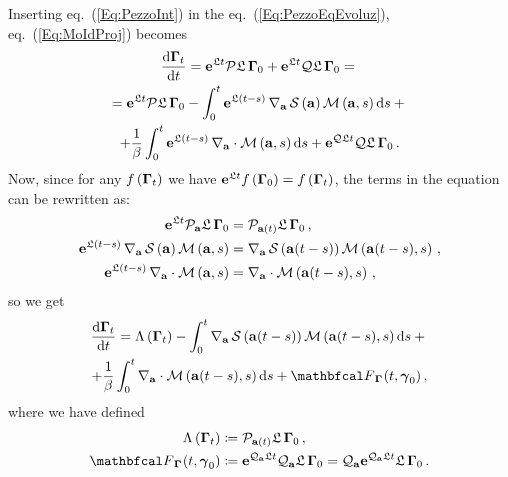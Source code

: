 \documentclass[10pt,a4paper]{book}
\theoremstyle{definition}
\begin{document}
\noindent
Inserting eq.~(\ref{Eq:PezzoInt}) in the eq.~(\ref{Eq:PezzoEqEvoluz}), eq.~(\ref{Eq:MoIdProj}) becomes
\begin{multline}
 \frac{\mbox{d}\boldsymbol\Gamma_{t}}{\mbox{d}t} = \mathbf{e}^{\mathfrak{L} t}\mathcal{P}\mathfrak{L}\,\boldsymbol\Gamma_{0} + \mathbf{e}^{\mathfrak{L} t}\mathcal{Q}\mathfrak{L}\,\boldsymbol\Gamma_{0} ={}\\
   = \mathbf{e}^{\mathfrak{L} t}\mathcal{P}\mathfrak{L}\,\boldsymbol\Gamma_{0} - \int_0^t \mathbf{e}^{\mathfrak{L}(t-s)}\,\nabla_{\mathbf{a}}\,\mathcal{S}\left(\mathbf{a}\right)\mathcal{M}\left(\mathbf{a},s\right) \mbox{d} s +{}\\
   + \frac{1}{\beta}\int_0^t \mathbf{e}^{\mathfrak{L}(t-s)}\,\nabla_{\mathbf{a}}\cdot\mathcal{M}\left(\mathbf{a},s\right) \mbox{d} s + \mathbf{e}^{\mathcal{Q}\mathfrak{L} t}\mathcal{Q}\mathfrak{L}\,\boldsymbol\Gamma_{0}\,. 
\end{multline}
Now, since for any $f\left(\boldsymbol\Gamma_{t}\right)$ we have $\mathbf{e}^{\mathfrak{L} t}f\left(\boldsymbol\Gamma_{0}\right)=f\left(\boldsymbol\Gamma_{t}\right)$, the terms in the equation can be rewritten as:
\begin{align*}
  \mathbf{e}^{\mathfrak{L} t}\mathcal{P}_{\mathbf{a}}\mathfrak{L}\,\boldsymbol\Gamma_{0} &= \mathcal{P}_{\mathbf{a}(t)}\mathfrak{L}\,\boldsymbol\Gamma_{0}\,,\\
  \mathbf{e}^{\mathfrak{L}(t-s)}\,\nabla_{\mathbf{a}}\,\mathcal{S}\left(\mathbf{a}\right)\mathcal{M}\left(\mathbf{a},s\right) &= 
  \nabla_{\mathbf{a}}\,\mathcal{S}\left(\mathbf{a}(t-s)\right)\mathcal{M}\left(\mathbf{a}(t-s),s\right)\,,\\ 
  \mathbf{e}^{\mathfrak{L}(t-s)}\,\nabla_{\mathbf{a}}\cdot\mathcal{M}\left(\mathbf{a},s\right) &= \nabla_{\mathbf{a}}\cdot\mathcal{M}\left(\mathbf{a}(t-s),s\right)\,,
\end{align*} 
so we get
\begin{multline}\label{Eq:MZequation}
 \totd{\Bphase{t}}{t} = \Lambda\cip{\Bphase{t}} 
    - \int_0^t \nabla_{\bfa}\,\entropy\cip{\bfa(t-s)}\fricmat\cip{\bfa(t-s),s} \diff s +{}\\
    + \frac{1}{\beta}\int_0^t \nabla_{\bfa}\cdot\fricmat\cip{\bfa(t-s),s} \diff s + \fprojbf_{\Bphase{}}(t,\Aphase{0})\,, 
\end{multline}
where we have defined
\begin{align}
 \label{Eq:Lamba(GammaT)}
 \Lambda\cip{\Bphase{t}} &\coloneqq \pproj_{\bfa(t)}\Lio\,\Bphase{0}\,,\\
 \label{Eq:RAndomForce}
 \fprojbf_{\Bphase{}}(t,\Aphase{0}) &\coloneqq \exp{\qproj_{\bfa}\Lio t}\qproj_{\bfa}\Lio\,\Bphase{0} = 
	   \qproj_{\bfa}\exp{\qproj_{\bfa}\Lio t}\Lio\,\Bphase{0}\,.
\end{align} 
\end{document}
